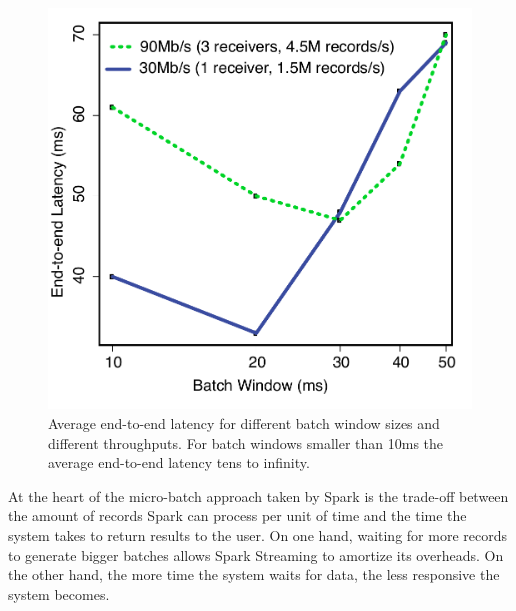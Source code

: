 \begin{figure}[t!]
  \begin{center}
    \includegraphics[scale=0.50]{images_graphs/batchsize_vs_latency/batchsize_vs_latency_illustrator.pdf}
  \end{center}
  \caption{Average end-to-end latency for different batch window sizes and different throughputs. For batch windows smaller than 10ms the average end-to-end latency tens to infinity.}
  \label{fig:Batchsize_vs_latency}
\end{figure}

At the heart of the micro-batch approach taken by Spark is the trade-off between the amount of records Spark can process per unit of time and the time the system takes to return results to the user.
On one hand, waiting for more records to generate bigger batches allows Spark Streaming to amortize its overheads. On the other hand, the more time the system waits for data, the less responsive the system becomes.


